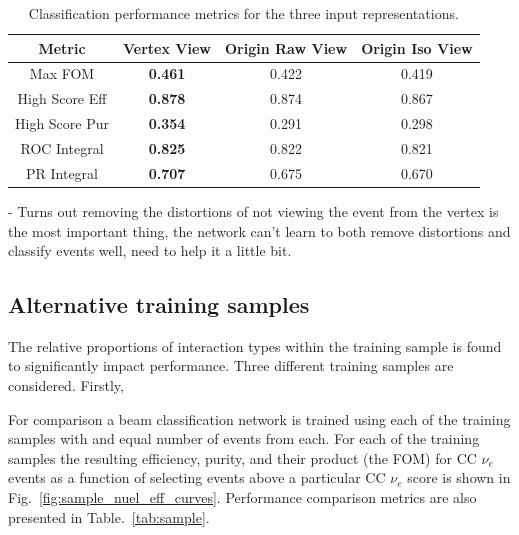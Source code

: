 \begin{table} %
    \begin{tabular}{cccc}
        Metric         & Vertex View    & Origin Raw View & Origin Iso View \\
        \midrule
        Max FOM        & \textbf{0.461} & 0.422           & 0.419           \\
        High Score Eff & \textbf{0.878} & 0.874           & 0.867           \\
        High Score Pur & \textbf{0.354} & 0.291           & 0.298           \\
        ROC Integral   & \textbf{0.825} & 0.822           & 0.821           \\
        PR Integral    & \textbf{0.707} & 0.675           & 0.670           \\
    \end{tabular}
    \caption[Classification performance metrics for three input representations]
    {Classification performance metrics for the three input representations.}
    \label{tab:repr}
\end{table}

- Turns out removing the distortions of not viewing the event from the vertex is the most
important thing, the network can't learn to both remove distortions and classify events well, need
to help it a little bit.

\subsection*{Alternative training samples} %

The relative proportions of interaction types within the training sample is found to significantly
impact performance. Three different training samples are considered. Firstly,

For comparison a beam classification network is trained using each of the training samples with
and equal number of events from each. For each of the training samples the resulting efficiency,
purity, and their product (the FOM) for CC $\nu_{e}$ events as a function of selecting events
above a particular CC $\nu_{e}$ score is shown in Fig.~\ref{fig:sample_nuel_eff_curves}.
Performance comparison metrics are also presented in Table.~\ref{tab:sample}.


